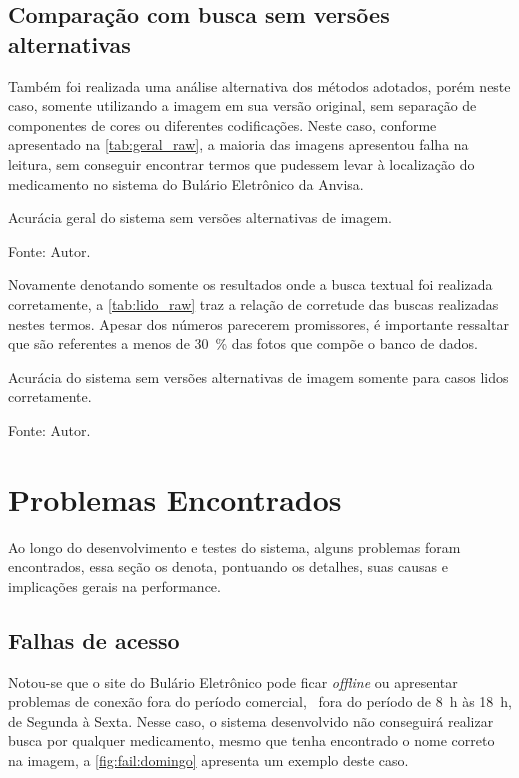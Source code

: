 \subsection{Comparação com busca sem versões alternativas}

Também foi realizada uma análise alternativa dos métodos adotados, porém neste caso, somente utilizando a imagem em sua versão original, sem separação de componentes de cores ou diferentes codificações.
Neste caso, conforme apresentado na \autoref{tab:geral_raw}, a maioria das imagens apresentou falha na leitura, sem conseguir encontrar termos que pudessem levar à localização do medicamento no sistema do Bulário Eletrônico da \ac{Anvisa}.

\begin{table}[htbp]
    \centering
    \caption{Acurácia geral do sistema sem versões alternativas de imagem.}
    \medskip
    \caption*{Fonte: Autor.}
    \label{tab:geral_raw}
\end{table}

Novamente denotando somente os resultados onde a busca textual foi realizada corretamente, a \autoref{tab:lido_raw} traz a relação de corretude das buscas realizadas nestes termos.
Apesar dos números parecerem promissores, é importante ressaltar que são referentes a menos de \SI{30}{\percent} das fotos que compõe o banco de dados.

\begin{table}[htbp]
    \centering
    \caption{Acurácia do sistema sem versões alternativas de imagem somente para casos lidos corretamente.}
    \medskip
    \caption*{Fonte: Autor.}
    \label{tab:lido_raw}
\end{table}


\section{Problemas Encontrados}\label{sec:problemas}

Ao longo do desenvolvimento e testes do sistema, alguns problemas foram encontrados, essa seção os denota, pontuando os detalhes, suas causas e implicações gerais na performance.

\subsection{Falhas de acesso}

Notou-se que o site do Bulário Eletrônico pode ficar \textit{offline} ou apresentar problemas de conexão fora do período comercial, \ie\ fora do período de \SI{8}{\hour} às \SI{18}{\hour}, de Segunda à Sexta.
Nesse caso, o sistema desenvolvido não conseguirá realizar busca por qualquer medicamento, mesmo que tenha encontrado o nome correto na imagem, a \autoref{fig:fail:domingo} apresenta um exemplo deste caso.

